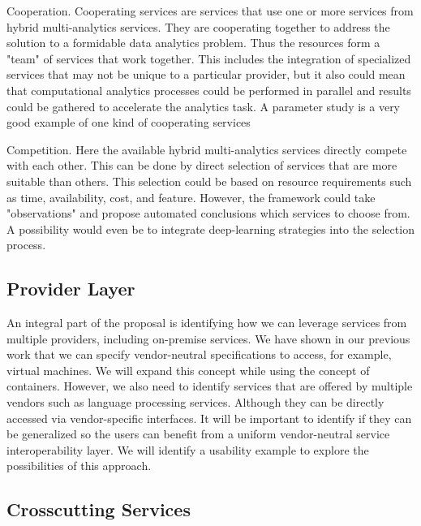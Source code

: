 \begin{description}

\item Cooperation. Cooperating services are services that use one or
  more services from hybrid multi-analytics services. They are cooperating
  together to address the solution to a formidable data analytics
  problem. Thus the resources form a "team" of services that work
  together. This includes the integration of specialized services that
  may not be unique to a particular provider, but it also could mean
  that computational analytics processes could be performed in
  parallel and results could be gathered to accelerate the analytics
  task. A parameter study is a very good example of one kind of
  cooperating services

\item Competition. Here the available hybrid multi-analytics services
  directly compete with each other. This can be done by direct
  selection of services that are more suitable than others. This
  selection could be based on resource requirements such as time,
  availability, cost, and feature. However, the framework could take
  "observations" and propose automated conclusions which services to
  choose from. A possibility would even be to integrate deep-learning
  strategies into the selection process.
  
\end{description}

\subsection{Provider Layer}

An integral part of the proposal is identifying how we can leverage
services from multiple providers, including on-premise services. We
have shown in our previous work that we can specify vendor-neutral
specifications to access, for example, virtual machines. We will expand
this concept while using the concept of containers. However, we also
need to identify services that are offered by
multiple vendors such as language processing services. Although they
can be directly accessed via vendor-specific interfaces. It will
be important to identify if they can be generalized so the users
can benefit from a uniform vendor-neutral service interoperability
layer. We will identify a usability example to explore the
possibilities of this approach.

\subsection{Crosscutting Services}

